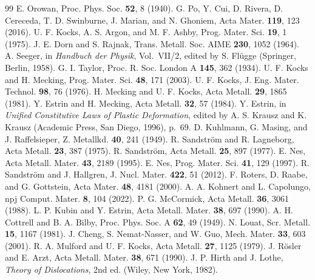 \documentclass[aps,prl,onecolumn,superscriptaddress,amsmath,amssymb,floatfix]{revtex4-2}
\begin{document}
\begin{thebibliography}{99}
 E. Orowan, Proc. Phys. Soc. \textbf{52}, 8 (1940).
 G. Po, Y. Cui, D. Rivera, D. Cereceda, T. D. Swinburne, J. Marian, and N. Ghoniem, Acta Mater. \textbf{119}, 123 (2016).
 U. F. Kocks, A. S. Argon, and M. F. Ashby, Prog. Mater. Sci. \textbf{19}, 1 (1975).
 J. E. Dorn and S. Rajnak, Trans. Metall. Soc. AIME \textbf{230}, 1052 (1964).
 A. Seeger, in \emph{Handbuch der Physik}, Vol.~VII/2, edited by S. Fl\"ugge (Springer, Berlin, 1958).
 G. I. Taylor, Proc. R. Soc. London A \textbf{145}, 362 (1934).
 U. F. Kocks and H. Mecking, Prog. Mater. Sci. \textbf{48}, 171 (2003).
 U. F. Kocks, J. Eng. Mater. Technol. \textbf{98}, 76 (1976).
 H. Mecking and U. F. Kocks, Acta Metall. \textbf{29}, 1865 (1981).
 Y. Estrin and H. Mecking, Acta Metall. \textbf{32}, 57 (1984).
 Y. Estrin, in \emph{Unified Constitutive Laws of Plastic Deformation}, edited by A. S. Krausz and K. Krausz (Academic Press, San Diego, 1996), p.~69.
 D. Kuhlmann, G. Masing, and J. Raffelsieper, Z. Metallkd. \textbf{40}, 241 (1949).
 R. Sandstr\"om and R. Lagneborg, Acta Metall. \textbf{23}, 387 (1975).
 R. Sandstr\"om, Acta Metall. \textbf{25}, 897 (1977).
 E. Nes, Acta Metall. Mater. \textbf{43}, 2189 (1995).
 E. Nes, Prog. Mater. Sci. \textbf{41}, 129 (1997).
 R. Sandstr\"om and J. Hallgren, J. Nucl. Mater. \textbf{422}, 51 (2012).
 F. Roters, D. Raabe, and G. Gottstein, Acta Mater. \textbf{48}, 4181 (2000).
 A. A. Kohnert and L. Capolungo, npj Comput. Mater. \textbf{8}, 104 (2022).
 P. G. McCormick, Acta Metall. \textbf{36}, 3061 (1988).
 L. P. Kubin and Y. Estrin, Acta Metall. Mater. \textbf{38}, 697 (1990).
 A. H. Cottrell and B. A. Bilby, Proc. Phys. Soc. A \textbf{62}, 49 (1949).
 N. Louat, Scr. Metall. \textbf{15}, 1167 (1981).
 J. Cheng, S. Nemat-Nasser, and W. Guo, Mech. Mater. \textbf{33}, 603 (2001).
 R. A. Mulford and U. F. Kocks, Acta Metall. \textbf{27}, 1125 (1979).
 J. R\"osler and E. Arzt, Acta Metall. Mater. \textbf{38}, 671 (1990).
 J. P. Hirth and J. Lothe, \emph{Theory of Dislocations}, 2nd ed. (Wiley, New York, 1982).

\end{thebibliography}
\end{document}
